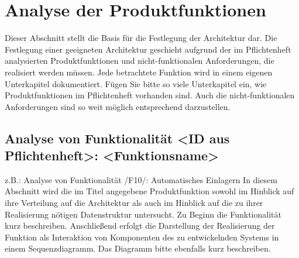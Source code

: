 \chapter{Analyse der Produktfunktionen}

Dieser Abschnitt stellt die Basis für die Festlegung der Architektur dar. Die
Festlegung einer geeigneten Architektur geschieht aufgrund der im Pflichtenheft
analysierten Produktfunktionen und nicht-funktionalen Anforderungen, die
realisiert werden müssen. Jede betrachtete Funktion wird in einem eigenen
Unterkapitel dokumentiert.  Fügen Sie bitte so viele Unterkapitel ein, wie
Produktfunktionen im Pflichtenheft vorhanden sind. Auch die nicht-funktionalen
Anforderungen sind so weit möglich entsprechend darzustellen.


\section{Analyse von Funktionalität <ID aus Pflichtenheft>: <Funktionsname>}
z.B.: Analyse von Funktionalität /F10/: Automatisches Einlagern
In diesem Abschnitt wird die im Titel angegebene Produktfunktion sowohl im
Hinblick auf ihre Verteilung auf die Architektur als auch im Hinblick auf die
zu ihrer Realisierung nötigen Datenstruktur untersucht.  Zu Beginn die
Funktionalität kurz beschreiben.  Anschließend erfolgt die Darstellung der
Realisierung der Funktion als Interaktion von Komponenten des zu entwickelnden
Systems in einem Sequenzdiagramm. Das Diagramm bitte ebenfalls kurz
beschreiben.

